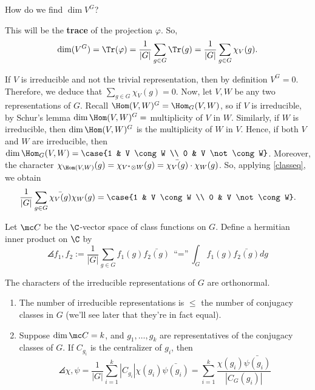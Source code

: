 \begin{notebox*}[Question]
    How do we find $\dim V^G$?
\end{notebox*}

This will be the \textbf{trace} of the projection $\varphi$. So,
\begin{equation} \label{classeq}
  \dim (V^G)=\Tr(\varphi)=\frac{1}{|G|}\sum_{g \in G}\Tr(g) = \frac{1}{|G|}\sum_{g \in G}\chi _V(g).
\end{equation}

If $V$ is irreducible and not the trivial representation, then by definition $V^G=0$. Therefore, we deduce that $\sum _{g \in G}\chi _V(g)=0$. Now, let $V,W$ be any two representations of $G$. Recall $\Hom(V,W)^G=\Hom_G(V,W)$, so if $V$ is irreducible, by Schur's lemma $\dim \Hom(V,W)^G =$ multiplicity of $V$ in $W$. Similarly, if $W$ is irreducible, then $\dim \Hom(V,W)^G$ is the multiplicity of $W$ in $V$. Hence, if both $V$ and $W$ are irreducible, then $\dim \Hom_G(V,W)=\case{1 & V \cong W \\ 0 & V \not \cong W}$. Moreover, the character $\chi _{\Hom(V,W)}(g) = \chi _{V ^* \otimes W}(g)=\bar{\chi_V(g)}\cdot \chi _W(g)$. So, applying \eqref{classeq}, we obtain
$$\frac{1}{|G|}\sum_{g \in G}\bar{\chi_V(g)}\chi _W(g) = \case{1 & V \cong W \\ 0 & V \not \cong W}.$$

Let $\mc C$ be the $\C$-vector space of class functions on $G$. Define a hermitian inner product on $\C$ by
$$\angles {f_1,f_2}:=\frac{1}{|G|}\sum_{g \in G}f_1(g)\bar{f_2(g)} \:\: \text{``=''}\: \int _G f_1(g)\bar{f_2(g)}dg$$

\begin{thm}[][label=thm:thm1]
    The characters of the irreducible representations of $G$ are orthonormal.
\end{thm}

\begin{rmk}
    \begin{enumerate}
        \item The number of irreducible representations is $\leq$ the number of conjugacy classes in $G$ (we'll see later that they're in fact equal).
        \item Suppose $\dim \mc C=k$, and $g_1,\dots,g_k$ are representatives of the conjugacy classes of $G$. If $C_{g_i}$ is the centralizer of $g_i$, then
        $$\angles{\chi, \psi}=\frac{1}{|G|}\sum_{i=1}^k|C_{g_i}|\chi(g_i)\bar{\psi(g_i)}=\sum_{i=1}^k\frac{\chi (g_i) \bar{\psi (g_i)}}{|C_G(g_i)|}$$
    \end{enumerate}
\end{rmk}

